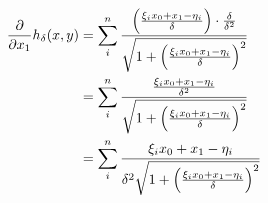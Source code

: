 \documentclass{article}
\begin{document}
\begin{align*}
	\frac{\partial}{\partial x_1} h_\delta(x,y) &=  \sum\limits_i^n \frac {\left( \frac {\xi_i x_0 + x_1 -\eta_i}{\delta}\right) \cdot \frac{\delta }{\delta^2} } {\sqrt{1+ \left( \frac {\xi_i x_0 + x_1 -\eta_i}{\delta}\right)^2  }}  \\
	&=  \sum\limits_i^n \frac {\frac {\xi_i x_0 + x_1 -\eta_i}{\delta^2} } {\sqrt{1+ \left( \frac {\xi_i x_0 + x_1 -\eta_i}{\delta}\right)^2  }}\\
	&=  \sum\limits_i^n \frac {\xi_i x_0 + x_1 -\eta_i}{\delta^2\sqrt{1+ \left( \frac {\xi_i x_0 + x_1 -\eta_i}{\delta}\right)^2  }} \\
\end{align*}




\end{document}
